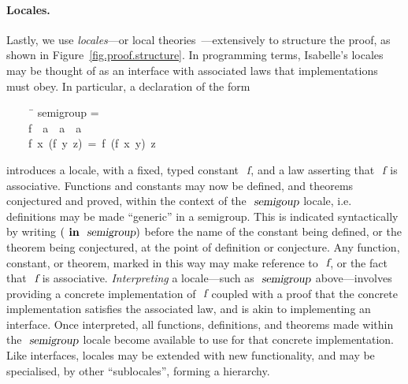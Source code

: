 \paragraph{Locales.}

Lastly, we use \emph{locales}---or local theories~\cite{DBLP:conf/tphol/KammullerWP99,DBLP:conf/types/HaftmannW08}---extensively to structure the proof, as shown in Figure~\ref{fig.proof.structure}.
In programming terms, Isabelle's locales may be thought of as an interface with associated laws that implementations must obey.
In particular, a declaration of the form
\begin{isabelle}
~~~~\ \=\kill
{} semigroup =\\
~~~~\>f\ {\isacharcolon}{\isacharcolon}\ {\isachardoublequoteopen}{\isacharprime}a\ {\isasymRightarrow}\ {\isacharprime}a{\isachardoublequoteclose}\ {\isasymRightarrow}\ {\isacharprime}a{\isachardoublequoteclose}\\
~~~~\>{\isachardoublequoteopen}f\ x\ (f\ y\ z)\ =\ f\ (f\ x\ y)\ z{\isachardoublequoteclose}
\end{isabelle}
\noindent
introduces a locale, with a fixed, typed constant $\isa{f}$, and a law asserting that $\isa{f}$ is associative.
Functions and constants may now be defined, and theorems conjectured and proved, within the context of the $\isa{semigoup}$ locale, i.e. definitions may be made ``generic'' in a semigroup.
This is indicated syntactically by writing $(\isacommand{in}\ \isa{semigroup})$ before the name of the constant being defined, or the theorem being conjectured, at the point of definition or conjecture.
Any function, constant, or theorem, marked in this way may make reference to $\isa{f}$, or the fact that $\isa{f}$ is associative.
\emph{Interpreting} a locale---such as $\isa{semigroup}$ above---involves providing a concrete implementation of $\isa{f}$ coupled with a proof that the concrete implementation satisfies the associated law, and is akin to implementing an interface.
Once interpreted, all functions, definitions, and theorems made within the $\isa{semigroup}$ locale become available to use for that concrete implementation.
Like interfaces, locales may be extended with new functionality, and may be specialised, by other ``sublocales'', forming a hierarchy.
